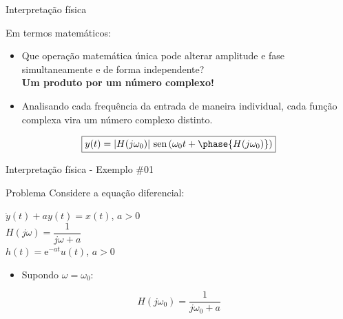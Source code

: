 \begin{frame}{Interpretação física}
\begin{block}{Em termos matemáticos:}
\begin{itemize}
    \item Que operação matemática única pode alterar amplitude e fase simultaneamente e de forma independente?\\
    \vspace{0.3 cm}
    \textbf{Um produto por um número complexo!}
    \vspace{0.3 cm}
        \item Analisando cada frequência da entrada de maneira individual, cada função complexa vira um número complexo distinto.
\end{itemize}
\vspace{0.2 cm}
    $$\boxed{ y(t)= |H(j\omega_{0})| \ \text{sen}\left(\omega_{0}t + \phase{H(j\omega_{0})}\right)}$$
\end{block}
\end{frame}

\begin{frame}{Interpretação física - Exemplo \#01}
    \begin{block}{Problema}
        Considere a equação diferencial:\\
        \begin{center}
            $\dot{y}(t) + ay(t) = x(t)$, $ a > 0 $ \\
            \vspace{0.3cm}
            $ H(j\omega) = \dfrac{1}{j\omega + a} $\\
            \vspace{0.3cm}
            $ h(t) = \text{e}^{-at}u(t)$, $ a > 0 $\\
        \end{center}
        \begin{itemize}
            \item Supondo $ \omega = \omega_{0} $:
        \end{itemize}
    \begin{equation*}
        H(j\omega_{0}) =  \dfrac{1}{j\omega_{0} + a}
    \end{equation*}
\end{block}
\end{frame}

